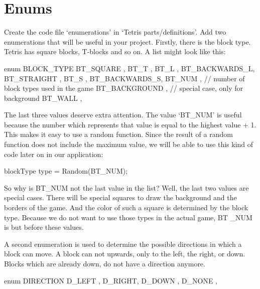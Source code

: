 \section{Enums}
Create the code file `enumerations' in  `Tetris parts/definitions'. Add two enumerations that will be useful in your project. Firstly, there is the block type. Tetris has square blocks, T-blocks and so on. A list might look like this:

\begin{code}
enum BLOCK_TYPE
{
   BT_SQUARE     ,
   BT_T          ,
   BT_L          ,
   BT_BACKWARDS_L,
   BT_STRAIGHT   ,
   BT_S          ,
   BT_BACKWARDS_S,
   BT_NUM        , // number of block types used in the game
   BT_BACKGROUND , // special case, only for background
   BT_WALL       ,      
}
\end{code}

The last three values ​​deserve extra attention. The value `BT\_NUM' is useful because the number which represents that value is equal to the highest value + 1. This makes it easy to use a random function. Since the result of a random function does not include the maximum value, we will be able to use this kind of code later on in our application:

\begin{code}
blockType type = Random(BT_NUM);
\end{code}

So why is BT\_NUM not the last value in the list? Well, the last two values ​​are special cases. There will be special squares to draw the background and the borders of the game. And the color of such a square is determined by the block type. Because we do not want to use those types in the actual game, BT \_NUM is but before these values.

A second enumeration is used to determine the possible directions in which a block can move. A block can not upwards, only to the left, the right, or down. Blocks which are already down, do not have a direction anymore.

\begin{code}
enum DIRECTION
{
   D_LEFT ,
   D_RIGHT,
   D_DOWN ,
   D_NONE ,
}
\end{code}
